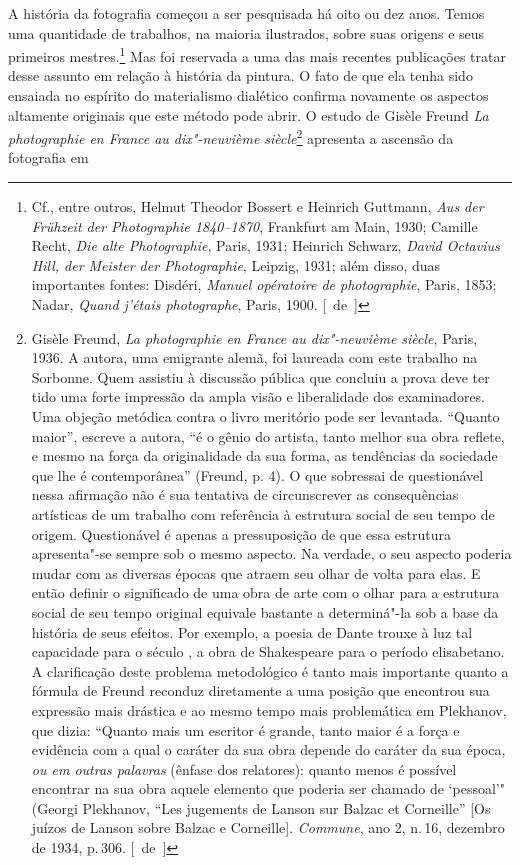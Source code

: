 A história da fotografia começou a ser pesquisada há oito ou dez anos.
Temos uma quantidade de trabalhos, na maioria ilustrados, sobre suas
origens e seus primeiros mestres.\footnote{Cf., entre outros, Helmut
  Theodor Bossert e Heinrich Guttmann, \emph{Aus der Frühzeit der
  Photographie 1840--1870}, Frankfurt am Main, 1930; Camille Recht,
  \emph{Die alte Photographie}, Paris, 1931; Heinrich Schwarz,
  \emph{David Octavius Hill, der Meister der Photographie}, Leipzig,
  1931; além disso, duas importantes fontes: Disdéri, \emph{Manuel
  opératoire de photographie}, Paris, 1853; Nadar, \emph{Quand
  j'étais photographe}, Paris, 1900. [~de~]} Mas foi reservada a uma das mais recentes
publicações tratar desse assunto em relação à história da
pintura. O fato de que ela tenha sido ensaiada no espírito do materialismo
dialético confirma novamente os aspectos altamente
originais que este método pode abrir. O estudo de Gisèle Freund \emph{La
photographie en France au dix"-neuvième siècle}\footnote{Gisèle Freund,
  \emph{La photographie en France au dix"-neuvième siècle}, Paris, 1936. A
  autora, uma emigrante alemã, foi laureada com este trabalho na
  Sorbonne. Quem assistiu à discussão pública que concluiu a prova deve
  ter tido uma forte impressão da ampla visão e liberalidade dos
  examinadores. Uma objeção metódica contra o livro meritório pode ser
  levantada. ``Quanto maior'', escreve a autora, ``é o gênio do artista,
  tanto melhor sua obra reflete, e mesmo na força da originalidade da
  sua forma, as tendências da sociedade que lhe é contemporânea''
  (Freund, p. 4). O que sobressai de questionável nessa afirmação não é
  sua tentativa de circunscrever as consequências artísticas de um
  trabalho com referência à estrutura social de seu tempo de origem.
  Questionável é apenas a pressuposição de que essa estrutura
  apresenta"-se sempre sob o mesmo aspecto. Na verdade, o seu aspecto
  poderia mudar com as diversas épocas que atraem seu olhar de volta
  para elas. E então definir o significado de uma obra de arte com o olhar
  para a estrutura social de seu tempo original equivale bastante a
  determiná"-la sob a base da história de seus efeitos. Por exemplo, a
  poesia de Dante trouxe à luz tal capacidade para o século , a obra
  de Shakespeare para o período elisabetano. A clarificação deste
  problema metodológico é tanto mais importante quanto a fórmula de
  Freund reconduz diretamente a uma posição que encontrou sua
  expressão mais drástica e ao mesmo tempo mais problemática em
  Plekhanov, que dizia: ``Quanto mais um escritor é grande, tanto maior é
  a força e evidência com a qual o caráter da sua obra depende do
  caráter da sua época, \emph{ou em outras palavras} (ênfase dos
  relatores): quanto menos é possível encontrar na sua obra aquele
  elemento que poderia ser chamado de `pessoal'" (Georgi Plekhanov,
  ``Les jugements de Lanson sur Balzac et Corneille'' {[}Os juízos de
  Lanson sobre Balzac e Corneille{]}. \emph{Commune}, ano 2, n.\,16, dezembro de
  1934, p.\,306. [~de~]} apresenta a ascensão da fotografia em
